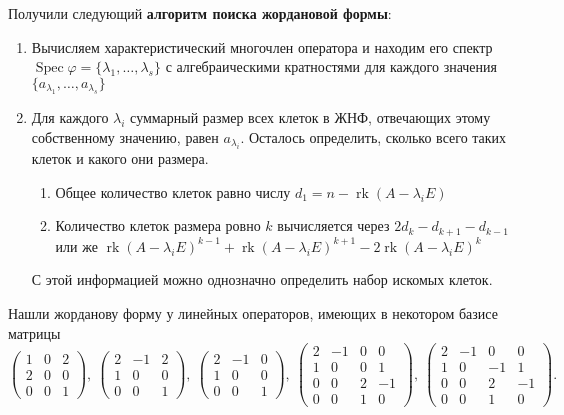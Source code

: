 \documentclass[10pt, a4paper]{extarticle}
\newcommand{\rk}{\operatorname{\mathrm{rk}}}
\newcommand{\Spec}{\operatorname{Spec}}
\theoremstyle{definition}
\begin{document}
Получили следующий \textbf{алгоритм поиска жордановой формы}:
\begin{enumerate}
	\item Вычисляем характеристический многочлен оператора и находим его спектр $\Spec \varphi = \{ \lambda_1, \dots, \lambda_s \}$ 
	с алгебраическими кратностями для каждого значения  $\{ a_{\lambda_1}, \dots, a_{\lambda_s} \}$
	\item Для каждого $\lambda_i$ суммарный размер всех клеток в ЖНФ, отвечающих этому собственному значению, равен $a_{\lambda_i}$. 
	Осталось определить, сколько всего таких клеток и какого они размера. 
	\begin{enumerate}
		\item Общее количество клеток равно числу $d_1 = n - \rk (A - \lambda_i E)$
		\item Количество клеток размера ровно $k$ вычисляется через $2d_k - d_{k+1} - d_{k-1}$ или же \;\;\;\;\;\;\;\;\;\;\; $\rk (A - \lambda_i E)^{k-1} + \rk (A - \lambda_i E)^{k+1} - 2 \rk (A - \lambda_i E)^k$
	\end{enumerate}
	С этой информацией можно однозначно определить набор искомых клеток.
\end{enumerate}
Нашли жорданову форму у линейных операторов, имеющих в некотором базисе матрицы
\[
\begin{pmatrix} 1 & 0 & 2 \\ 2 & 0 & 0 \\ 0 & 0 & 1 \end{pmatrix}, \
\begin{pmatrix} 2 & -1 & 2 \\ 1 & 0 & 0 \\ 0 & 0 & 1 \end{pmatrix}, \
\begin{pmatrix} 2 & -1 & 0 \\ 1 & 0 & 0 \\ 0 & 0 & 1 \end{pmatrix}, \
\begin{pmatrix} 2 & -1 & 0 & 0 \\ 1 & 0 & 0 & 1 \\ 0 & 0 & 2 & -1 \\ 0 & 0 & 1 & 0 \end{pmatrix}, \
\begin{pmatrix} 2 & -1 & 0 & 0 \\ 1 & 0 & -1 & 1 \\ 0 & 0 & 2 & -1 \\ 0 & 0 & 1 & 0 \end{pmatrix}.
\]
\end{document}
